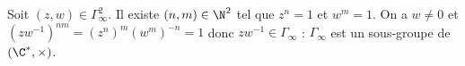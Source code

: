 Soit $(z,w)\in\Gamma^2_\infty$. Il existe $(n,m)\in\N^2$ tel que $z^n = 1$ et
$w^m = 1$. On a $w \neq 0$ et $(zw^{-1})^{nm} = (z^n)^m (w^m)^{-n} = 1$ donc
$zw^{-1}\in\Gamma_\infty$ : $\Gamma_\infty$ est un sous-groupe de
$(\C^{\ast},\times)$.

